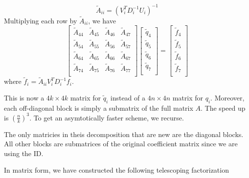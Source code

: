 \begin{equation*}
    \widetilde{A}_{ii} = (V^T_i D_i^{-1}U_i)^{-1}
\end{equation*}
Multiplying each row by  $\widetilde{A}_{ii}$, we have
\begin{equation*}
        \begin{bmatrix}
        \widetilde{A}_{44}    & \widetilde{A}_{45} & \widetilde{A}_{46} & \widetilde{A}_{47} \\
        \widetilde{A}_{54} & \widetilde{A}_{55}     & \widetilde{A}_{56} & \widetilde{A}_{57} \\
        \widetilde{A}_{64} & \widetilde{A}_{65} & \widetilde{A}_{66}     & \widetilde{A}_{67} \\
        \widetilde{A}_{74} & \widetilde{A}_{75} & \widetilde{A}_{76} &    \widetilde{A}_{77}     \\
    \end{bmatrix}
    \begin{bmatrix}
        \widetilde{q}_4 \\
        \widetilde{q}_5 \\
        \widetilde{q}_6 \\
        \widetilde{q}_7 \\
    \end{bmatrix}
    =
    \begin{bmatrix}
        \widetilde{f}_4 \\
        \widetilde{f}_5 \\
        \widetilde{f}_6 \\
        \widetilde{f}_7 \\
    \end{bmatrix}
\end{equation*}
where $\widetilde{f}_i = \widetilde{A}_{ii}V^T_iD_i^{-1}f_i$.

This is now a $4k \times 4k$ matrix for $\widetilde{q}_i$ instead of a $4n \times 4n$ matrix for $q_i$. Moreover, each off-diagonal block is simply a submatrix of the full matrix $A$. The speed up is $(\frac{n}{k})^3$. To get an asymtotically faster scheme, we recurse.



The only matricies in theis decomposition that are new are the diagonal blocks. All other blocks are submatrices of the original coefficient matrix since we are using the ID.


In matrix form, we have constructed the following telescoping factorization

